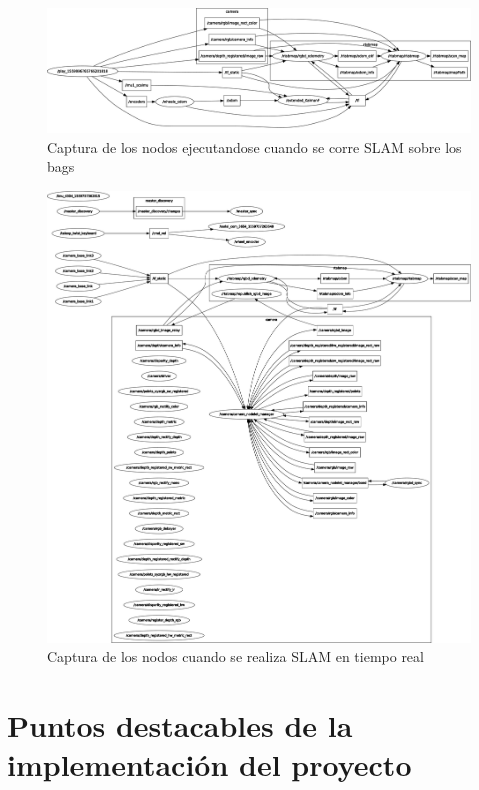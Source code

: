 \begin{figure}[!ht]
    \centering
    \includegraphics[width=.8\textwidth]{images/rqt_graphs/graph_RTABMAP.pdf}
    \caption{Captura de los nodos ejecutandose cuando se corre SLAM sobre los bags}
    \label{rqt01}
\end{figure}

\begin{figure}[!ht]
    \centering
    \includegraphics[width=.8\textwidth]{images/rqt_graphs/rpi_onboardSLAM.pdf}
    \caption{Captura de los nodos cuando se realiza SLAM en tiempo real}
    \label{rqt01}
\end{figure}

\section{Puntos destacables de la implementación del proyecto}

